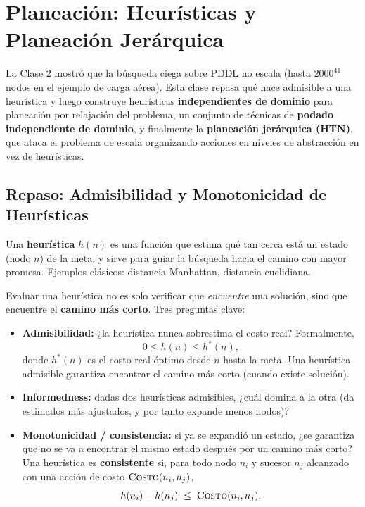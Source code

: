 \section{Planeación: Heurísticas y Planeación Jerárquica}

La Clase 2 mostró que la búsqueda ciega sobre PDDL no escala (hasta $2000^{41}$ nodos en el ejemplo
de carga aérea). Esta clase repasa qué hace admisible a una heurística y luego construye
heurísticas \textbf{independientes de dominio} para planeación por relajación del problema, un
conjunto de técnicas de \textbf{podado independiente de dominio}, y finalmente la
\textbf{planeación jerárquica (HTN)}, que ataca el problema de escala organizando acciones en
niveles de abstracción en vez de heurísticas.

\subsection{Repaso: Admisibilidad y Monotonicidad de Heurísticas}

\begin{definition}[Heurística]
Una \textbf{heurística} $h(n)$ es una función que estima qué tan cerca está un estado (nodo $n$) de
la meta, y sirve para guiar la búsqueda hacia el camino con mayor promesa. Ejemplos clásicos:
distancia Manhattan, distancia euclidiana.
\end{definition}

Evaluar una heurística no es solo verificar que \emph{encuentre} una solución, sino que encuentre el
\textbf{camino más corto}. Tres preguntas clave:
\begin{itemize}
    \item \textbf{Admisibilidad:} ¿la heurística nunca sobrestima el costo real? Formalmente,
    \[
        0 \le h(n) \le h^*(n),
    \]
    donde $h^*(n)$ es el costo real óptimo desde $n$ hasta la meta. Una heurística admisible
    garantiza encontrar el camino más corto (cuando existe solución).
    \item \textbf{Informedness:} dadas dos heurísticas admisibles, ¿cuál domina a la otra (da
    estimados más ajustados, y por tanto expande menos nodos)?
    \item \textbf{Monotonicidad / consistencia:} si ya se expandió un estado, ¿se garantiza que no se
    va a encontrar el mismo estado después por un camino más corto? Una heurística es
    \textbf{consistente} si, para todo nodo $n_i$ y sucesor $n_j$ alcanzado con una acción de costo
    $\textsc{Costo}(n_i,n_j)$,
    \[
        h(n_i) - h(n_j) \;\le\; \textsc{Costo}(n_i,n_j).
    \]
\end{itemize}

